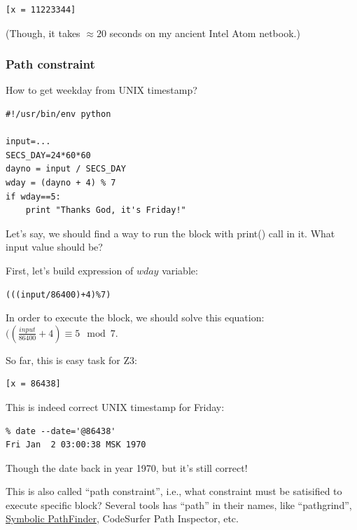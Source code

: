 

\begin{lstlisting}
[x = 11223344]
\end{lstlisting}

(Though, it takes $\approx 20$ seconds on my ancient Intel Atom netbook.)

\subsubsection{Path constraint}

How to get weekday from UNIX timestamp?

\begin{lstlisting}
#!/usr/bin/env python

input=...
SECS_DAY=24*60*60
dayno = input / SECS_DAY
wday = (dayno + 4) % 7
if wday==5:
    print "Thanks God, it's Friday!"
\end{lstlisting}

Let's say, we should find a way to run the block with print() call in it.
What input value should be?

First, let's build expression of $wday$ variable:



\begin{lstlisting}
(((input/86400)+4)%7)
\end{lstlisting}

In order to execute the block, we should solve this equation: $((\frac{input}{86400}+4) \equiv 5 \mod 7$.

So far, this is easy task for Z3:



\begin{lstlisting}
[x = 86438]
\end{lstlisting}

This is indeed correct UNIX timestamp for Friday:

\begin{lstlisting}
% date --date='@86438'
Fri Jan  2 03:00:38 MSK 1970
\end{lstlisting}

Though the date back in year 1970, but it's still correct!

This is also called ``path constraint'', i.e., what constraint must be satisified to execute specific block?
Several tools has ``path'' in their names, like
``pathgrind'', 
\href{http://babelfish.arc.nasa.gov/trac/jpf/wiki/projects/jpf-symbc}{Symbolic PathFinder}, CodeSurfer Path Inspector, etc.

